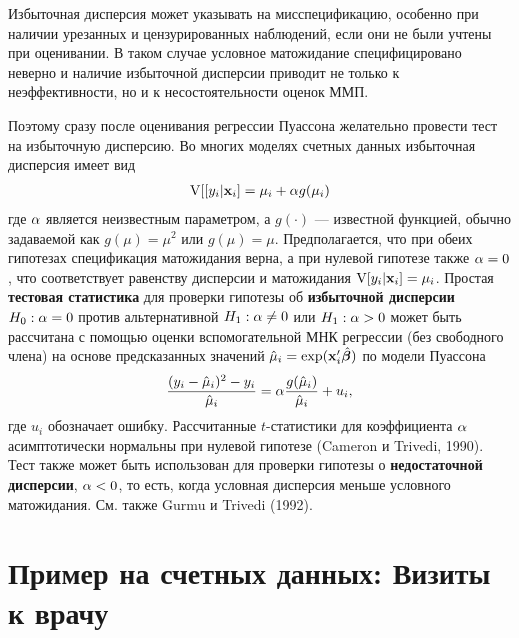 Избыточная дисперсия может указывать на мисспецификацию, особенно при наличии урезанных и цензурированных наблюдений, если они не были учтены при оценивании. В таком случае условное матожидание специфицировано неверно и наличие избыточной дисперсии приводит не только к неэффективности, но и к несостоятельности оценок ММП.

Поэтому сразу после оценивания регрессии Пуассона желательно провести тест на избыточную дисперсию. Во многих моделях счетных данных избыточная дисперсия имеет вид
    \begin{align}\label{eq:20.9}
    \mathrm{V}[[y_i|\mathbf{x}_i] = \mu_i + \alpha g(\mu_i)
    \end{align}
где $\alpha$ является неизвестным параметром, а $g(\cdot)$ --- известной функцией, обычно задаваемой как $g(\mu) = \mu^2$ или $g(\mu) =\mu$. Предполагается, что при обеих гипотезах спецификация матожидания верна, а при нулевой гипотезе также $\alpha = 0$, что соответствует равенству дисперсии и матожидания $\mathrm{V}[y_i|\mathbf{x}_i] = \mu_i$.
Простая \textbf{тестовая статистика} для проверки гипотезы об \textbf{избыточной дисперсии} $H_0: \alpha = 0$ против альтернативной $H_1: \alpha \ne 0$ или $H_1: \alpha > 0$ может быть рассчитана с помощью оценки вспомогательной МНК регрессии (без свободного члена) на основе предсказанных значений $\hat{\mu}_i = \exp(\mathbf{x}'_i\hat{\bm{\beta}})$ по модели Пуассона
    \begin{align}\label{eq:20.10}
    \frac{(y_i - \hat{\mu}_i)^2 - y_i}{\hat{\mu}_i} = \alpha\frac{g(\hat{\mu}_i)}{\hat{\mu}_i} + u_i,
    \end{align}
где $u_i$ обозначает ошибку. Рассчитанные $t$-статистики для коэффициента $\alpha$ асимптотически нормальны при нулевой гипотезе (Cameron и Trivedi, 1990). Тест также может быть использован для проверки гипотезы о \textbf{недостаточной дисперсии}, $\alpha < 0$, то есть, когда условная дисперсия меньше условного матожидания. См. также Gurmu и Trivedi (1992).




\section{Пример на счетных данных: Визиты к врачу}\label{sec:20.3}

